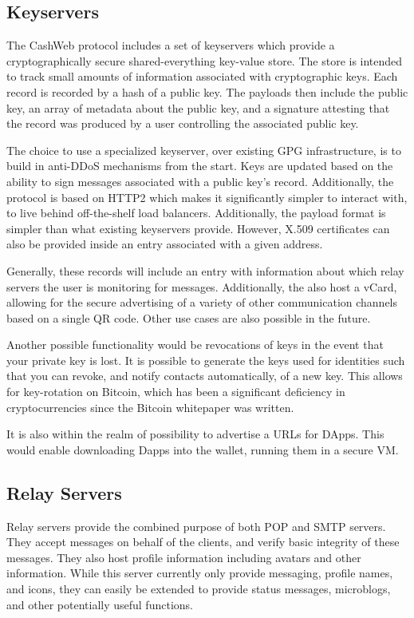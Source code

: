 \documentclass{article}
\theoremstyle{definition}
\begin{document}
\subsection{Keyservers}

The CashWeb protocol includes a set of keyservers which provide a cryptographically secure shared-everything key-value store. The store is intended to track small amounts of information associated with cryptographic keys. Each record is recorded by a hash of a public key. The payloads then include the public key, an array of metadata about the public key, and a signature attesting that the record was produced by a user controlling the associated public key.

The choice to use a specialized keyserver, over existing GPG infrastructure, is to build in anti-DDoS mechanisms from the start. Keys are updated based on the ability to sign messages associated with a public key's record. Additionally, the protocol is based on HTTP2 which makes it significantly simpler to interact with, to live behind off-the-shelf load balancers. Additionally, the payload format is simpler than what existing keyservers provide. However, X.509 certificates can also be provided inside an entry associated with a given address.

Generally, these records will include an entry with information about which relay servers the user is monitoring for messages. Additionally, the also host a vCard, allowing for the secure advertising of a variety of other communication channels based on a single QR code. Other use cases are also possible in the future.

Another possible functionality would be revocations of keys in the event that your private key is lost. It is possible to generate the keys used for identities such that you can revoke, and notify contacts automatically, of a new key. This allows for key-rotation on Bitcoin, which has been a significant deficiency in cryptocurrencies since the Bitcoin whitepaper was written.

It is also within the realm of possibility to advertise a URLs for DApps. This would enable downloading Dapps into the wallet, running them in a secure VM.

\subsection{Relay Servers}

Relay servers provide the combined purpose of both POP and SMTP servers. They accept messages on behalf of the clients, and verify basic integrity of these messages. They also host profile information including avatars and other information. While this server currently only provide messaging, profile names, and icons, they can easily be extended to provide status messages, microblogs, and other potentially useful functions.
\end{document}
